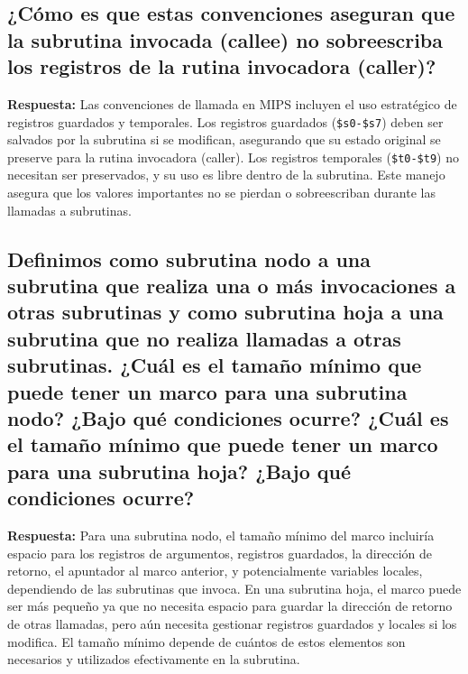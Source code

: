 \documentclass{article}
\begin{document}
\subsection{¿Cómo es que estas convenciones aseguran que la subrutina invocada (callee) no sobreescriba los registros de la rutina invocadora (caller)?}
\textbf{Respuesta:} Las convenciones de llamada en MIPS incluyen el uso estratégico de registros guardados y temporales. Los registros guardados (\texttt{\$s0-\$s7}) deben ser salvados por la subrutina si se modifican, asegurando que su estado original se preserve para la rutina invocadora (caller). Los registros temporales (\texttt{\$t0-\$t9}) no necesitan ser preservados, y su uso es libre dentro de la subrutina. Este manejo asegura que los valores importantes no se pierdan o sobreescriban durante las llamadas a subrutinas.

\subsection{Definimos como subrutina nodo a una subrutina que realiza una o más invocaciones a otras subrutinas y como subrutina hoja a una subrutina que no realiza llamadas a otras subrutinas. ¿Cuál es el tamaño mínimo que puede tener un marco para una subrutina nodo? ¿Bajo qué condiciones ocurre? ¿Cuál es el tamaño mínimo que puede tener un marco para una subrutina hoja? ¿Bajo qué condiciones ocurre?}
\textbf{Respuesta:} Para una subrutina nodo, el tamaño mínimo del marco incluiría espacio para los registros de argumentos, registros guardados, la dirección de retorno, el apuntador al marco anterior, y potencialmente variables locales, dependiendo de las subrutinas que invoca. En una subrutina hoja, el marco puede ser más pequeño ya que no necesita espacio para guardar la dirección de retorno de otras llamadas, pero aún necesita gestionar registros guardados y locales si los modifica. El tamaño mínimo depende de cuántos de estos elementos son necesarios y utilizados efectivamente en la subrutina.
\end{document}
